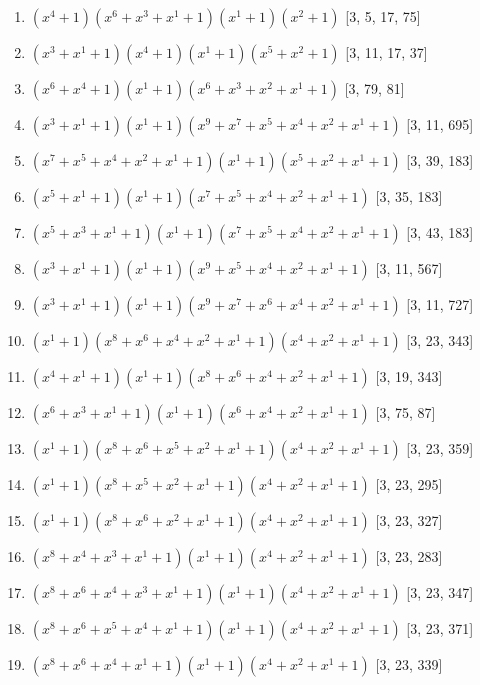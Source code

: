 \documentclass[10pt,twocolumn]{article}
\begin{document}
\begin{enumerate}
\item $(x^{4} + 1)(x^{6} + x^{3} + x^{1} + 1)(x^{1} + 1)(x^{2} + 1)$  [3, 5, 17, 75]
\item $(x^{3} + x^{1} + 1)(x^{4} + 1)(x^{1} + 1)(x^{5} + x^{2} + 1)$  [3, 11, 17, 37]
\item $(x^{6} + x^{4} + 1)(x^{1} + 1)(x^{6} + x^{3} + x^{2} + x^{1} + 1)$  [3, 79, 81]
\item $(x^{3} + x^{1} + 1)(x^{1} + 1)(x^{9} + x^{7} + x^{5} + x^{4} + x^{2} + x^{1} + 1)$  [3, 11, 695]
\item $(x^{7} + x^{5} + x^{4} + x^{2} + x^{1} + 1)(x^{1} + 1)(x^{5} + x^{2} + x^{1} + 1)$  [3, 39, 183]
\item $(x^{5} + x^{1} + 1)(x^{1} + 1)(x^{7} + x^{5} + x^{4} + x^{2} + x^{1} + 1)$  [3, 35, 183]
\item $(x^{5} + x^{3} + x^{1} + 1)(x^{1} + 1)(x^{7} + x^{5} + x^{4} + x^{2} + x^{1} + 1)$  [3, 43, 183]
\item $(x^{3} + x^{1} + 1)(x^{1} + 1)(x^{9} + x^{5} + x^{4} + x^{2} + x^{1} + 1)$  [3, 11, 567]
\item $(x^{3} + x^{1} + 1)(x^{1} + 1)(x^{9} + x^{7} + x^{6} + x^{4} + x^{2} + x^{1} + 1)$  [3, 11, 727]
\item $(x^{1} + 1)(x^{8} + x^{6} + x^{4} + x^{2} + x^{1} + 1)(x^{4} + x^{2} + x^{1} + 1)$  [3, 23, 343]
\item $(x^{4} + x^{1} + 1)(x^{1} + 1)(x^{8} + x^{6} + x^{4} + x^{2} + x^{1} + 1)$  [3, 19, 343]
\item $(x^{6} + x^{3} + x^{1} + 1)(x^{1} + 1)(x^{6} + x^{4} + x^{2} + x^{1} + 1)$  [3, 75, 87]
\item $(x^{1} + 1)(x^{8} + x^{6} + x^{5} + x^{2} + x^{1} + 1)(x^{4} + x^{2} + x^{1} + 1)$  [3, 23, 359]
\item $(x^{1} + 1)(x^{8} + x^{5} + x^{2} + x^{1} + 1)(x^{4} + x^{2} + x^{1} + 1)$  [3, 23, 295]
\item $(x^{1} + 1)(x^{8} + x^{6} + x^{2} + x^{1} + 1)(x^{4} + x^{2} + x^{1} + 1)$  [3, 23, 327]
\item $(x^{8} + x^{4} + x^{3} + x^{1} + 1)(x^{1} + 1)(x^{4} + x^{2} + x^{1} + 1)$  [3, 23, 283]
\item $(x^{8} + x^{6} + x^{4} + x^{3} + x^{1} + 1)(x^{1} + 1)(x^{4} + x^{2} + x^{1} + 1)$  [3, 23, 347]
\item $(x^{8} + x^{6} + x^{5} + x^{4} + x^{1} + 1)(x^{1} + 1)(x^{4} + x^{2} + x^{1} + 1)$  [3, 23, 371]
\item $(x^{8} + x^{6} + x^{4} + x^{1} + 1)(x^{1} + 1)(x^{4} + x^{2} + x^{1} + 1)$  [3, 23, 339]

\end{enumerate}
\end{document}
